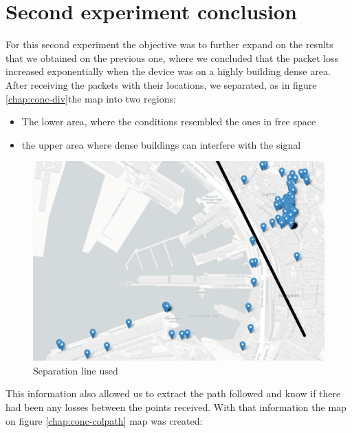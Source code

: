 \section{Second experiment conclusion}
For this second experiment the objective was to further expand on the results that we obtained on the previous one, where we concluded that the packet loss increased exponentially when the device was on a highly building dense area.
After receiving the packets with their locations, we separated, as in figure \vref{chap:conc-div}the map into two regions:
\begin{itemize}
    \item  The lower area, where the conditions resembled the ones in free space
    \item  the upper area where dense buildings can interfere with the signal
\end{itemize}

\begin{figure}[htpb]
\centering    
\includegraphics[width=\linewidth]{dividedGenova.png}
\caption{Separation line used}
\label{chap:conc-div}
\end{figure}

This information also allowed us to extract the path followed and know if there had been any losses between the points received.
With that information the map on figure \vref{chap:conc-colpath} map was created:

